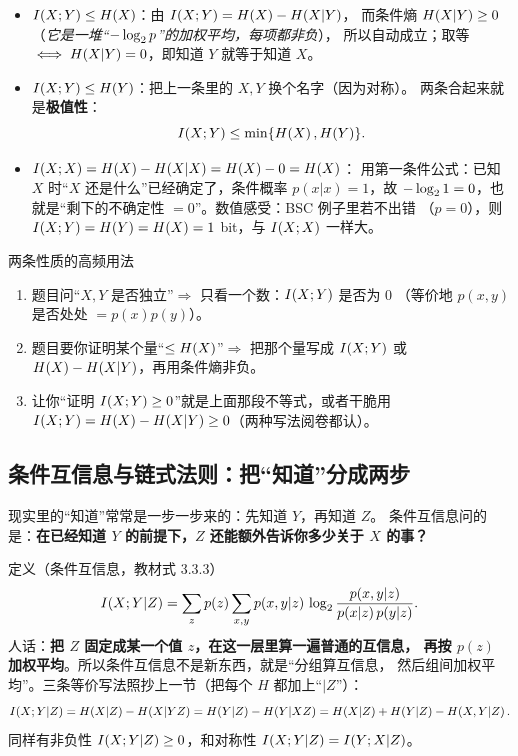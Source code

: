 \begin{itemize}[leftmargin=1.6em,itemsep=3pt,topsep=2pt]
  \item \textbf{$I\!\left(X;Y\right)\le H\!\left(X\right)$}：由 $I\!\left(X;Y\right)=H\!\left(X\right)-H\!\left(X|Y\right)$，
        而条件熵 $H\!\left(X|Y\right)\ge0$（\emph{它是一堆“$-\log_{2} p$”的加权平均，每项都非负}），
        所以自动成立；取等 $\iff H\!\left(X|Y\right)=0$，即知道 $Y$ 就等于知道 $X$。
  \item \textbf{$I\!\left(X;Y\right)\le H\!\left(Y\right)$}：把上一条里的 $X,Y$ 换个名字（因为对称）。
        两条合起来就是\textbf{极值性}：
        \[
        I\!\left(X;Y\right)\le\min\{H\!\left(X\right),H\!\left(Y\right)\}.
        \]
  \item \textbf{$I\!\left(X;X\right)=H\!\left(X\right)-H\!\left(X|X\right)=H\!\left(X\right)-0=H\!\left(X\right)$}：
        用第一条件公式：已知 $X$ 时“$X$ 还是什么”已经确定了，条件概率
        $p(x|x)=1$，故 $-\log_{2}1=0$，也就是“剩下的不确定性 $=0$”。数值感受：BSC 例子里若不出错
        （$p=0$），则 $I\!\left(X;Y\right)=H\!\left(Y\right)=H\!\left(X\right)=1$ bit，与 $I\!\left(X;X\right)$ 一样大。
\end{itemize}

\begin{exam}{两条性质的高频用法}
\begin{enumerate}[leftmargin=1.8em,itemsep=2pt,topsep=2pt]
  \item 题目问“$X,Y$ 是否独立”$\Rightarrow$ 只看一个数：$I\!\left(X;Y\right)$ 是否为 $0$
        （等价地 $p(x,y)$ 是否处处 $=p(x)p(y)$）。
  \item 题目要你证明某个量“$\le H\!\left(X\right)$”$\Rightarrow$ 把那个量写成
        $I\!\left(X;Y\right)$ 或 $H\!\left(X\right)-H\!\left(X|Y\right)$，再用条件熵非负。
  \item 让你“证明 $I\!\left(X;Y\right)\ge0$”就是上面那段不等式，或者干脆用
        $I\!\left(X;Y\right)=H\!\left(X\right)-H\!\left(X|Y\right)\ge0$（两种写法阅卷都认）。
\end{enumerate}
\end{exam}

\subsection{条件互信息与链式法则：把“知道”分成两步}

现实里的“知道”常常是一步一步来的：先知道 $Y$，再知道 $Z$。
条件互信息问的是：\textbf{在已经知道 $Y$ 的前提下，$Z$ 还能额外告诉你多少关于 $X$ 的事？}

\begin{defbox}{定义（条件互信息，教材式 3.3.3）}
\[
I\!\left(X;Y|Z\right)=\sum_{z}p(z)\sum_{x,y}p(x,y|z)\,\log_{2}\frac{p(x,y|z)}{p(x|z)\,p(y|z)} .
\]
人话：\textbf{把 $Z$ 固定成某一个值 $z$，在这一层里算一遍普通的互信息，
再按 $p(z)$ 加权平均}。所以条件互信息不是新东西，就是“分组算互信息，
然后组间加权平均”。三条等价写法照抄上一节（把每个 $H$ 都加上“$|Z$”）：
\[
\I{X;Y|Z}=\Hx{X|Z}-\Hx{X|YZ}=\Hx{Y|Z}-\Hx{Y|XZ}
=\Hx{X|Z}+\Hx{Y|Z}-\Hx{X,Y|Z}.
\]
同样有非负性 $I\!\left(X;Y|Z\right)\ge0$，和对称性 $I\!\left(X;Y|Z\right)=I\!\left(Y;X|Z\right)$。
\end{defbox}

